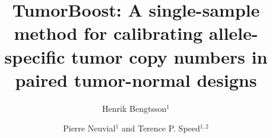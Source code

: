 \documentclass[10pt]{bmc_article}
\newenvironment{bmcformat}{\fussy\setboolean{publ}{true}}{\fussy}
\begin{document}
\begin{bmcformat}



\title{TumorBoost: A single-sample method for calibrating allele-specific tumor copy numbers in paired tumor-normal designs}



\author{Henrik Bengtsson\correspondingauthor$^1$%
      \and
         Pierre Neuvial$^1$%
       and 
         Terence P. Speed$^{1,2}$%
   }
      


\address{%
    \iid(1) Department of Statistics, University of California, Berkeley, USA\\
    \iid(2) Bioinformatics Division, Walter \& Eliza Hall Institute of Medical Research, Parkville, Australia
}%

\maketitle



\end{bmcformat}
\end{document}
